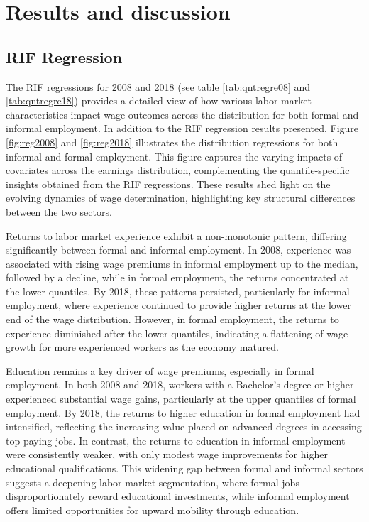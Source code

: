 \section{Results and discussion} \label{sec:resultsNdiscussion}

\subsection{RIF Regression}
The RIF regressions for 2008 and 2018 (see table  \ref{tab:qntregre08} and 	\ref{tab:qntregre18}) provides a detailed view of how various labor market characteristics impact wage outcomes across the distribution for both formal and informal employment. In addition to the RIF regression results presented, Figure \ref{fig:reg2008} and \ref{fig:reg2018} illustrates the distribution regressions for both informal and formal employment. This figure captures the varying impacts of covariates across the earnings distribution, complementing the quantile-specific insights obtained from the RIF regressions. These results shed light on the evolving dynamics of wage determination, highlighting key structural differences between the two sectors. 

Returns to labor market experience exhibit a non-monotonic pattern, differing significantly between formal and informal employment. In 2008, experience was associated with rising wage premiums in informal employment up to the median, followed by a decline, while in formal employment, the returns concentrated at the lower quantiles. By 2018, these patterns persisted, particularly for informal employment, where experience continued to provide higher returns at the lower end of the wage distribution. However, in formal employment, the returns to experience diminished after the lower quantiles, indicating a flattening of wage growth for more experienced workers as the economy matured. 

Education remains a key driver of wage premiums, especially in formal employment. In both 2008 and 2018, workers with a Bachelor's degree or higher experienced substantial wage gains, particularly at the upper quantiles of formal employment. By 2018, the returns to higher education in formal employment had intensified, reflecting the increasing value placed on advanced degrees in accessing top-paying jobs. In contrast, the returns to education in informal employment were consistently weaker, with only modest wage improvements for higher educational qualifications. This widening gap between formal and informal sectors suggests a deepening labor market segmentation, where formal jobs disproportionately reward educational investments, while informal employment offers limited opportunities for upward mobility through education.

